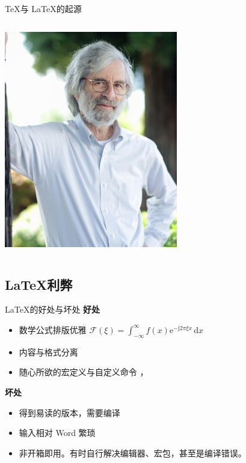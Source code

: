 \begin{frame}[fragile]{\TeX 与 \LaTeX 的起源}
\begin{columns}[T]
    \hspace{-10mm} \includegraphics[width=\textwidth]{Lamport.jpg}

  \end{columns}
\end{frame}

\subsection{\LaTeX 利弊}

\begin{frame}[fragile]{\LaTeX 的好处与坏处}
    \textbf{好处}
    \begin{itemize}
        \item 数学公式排版优雅 \quad $\mathcal{F}(\xi)=\int_{-\infty}^{\infty} f(x)\mathrm{e}^{-\mathrm{j}2\pi \xi x}\,\mathrm{d}x$
        \item 内容与格式分离
        \item 随心所欲的宏定义与自定义命令 ，
    \end{itemize}

    \vspace{2em}
    \textbf{坏处}
    \begin{itemize}
        \item 得到易读的版本，需要编译
        \item 输入相对 Word 繁琐
        \item 非开箱即用。有时自行解决编辑器、宏包，甚至是编译错误。
    \end{itemize}

\end{frame}

